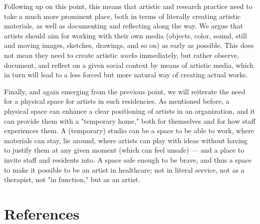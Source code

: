 \documentclass[authordate, empirical]{jote-new-article}
\begin{document}
{	Following up on this point, this means that artistic and research practice need to take a much more prominent place, both in terms of literally creating artistic materials, as well as documenting and reflecting along the way. We argue that artists should aim for working with their own media (objects, color, sound, still and moving images, sketches, drawings, and so on) as early as possible. This does not mean they need to create artistic \emph{works} immediately, but rather observe, document, and reflect on a given social context by means of artistic media, which in turn will lead to a less forced but more natural way of creating actual works.







	Finally, and again emerging from the previous point, we will reiterate the need for a physical space for artists in such residencies. As mentioned before, a physical space can enhance a clear positioning of artists in an organization, and it can provide them with a "temporary home," both for themselves and for how staff experiences them. A (temporary) studio can be a space to be able to work, where materials can stay, lie around, where artists can play with ideas without having to justify them at any given moment (which can feel unsafe) — and a place to invite staff and residents into. A space safe enough to be brave, and thus a space to make it possible to be an artist in healthcare; not in literal service, not as a therapist, not "in function," but as an artist.

	}


	\section{References}
\end{document}
